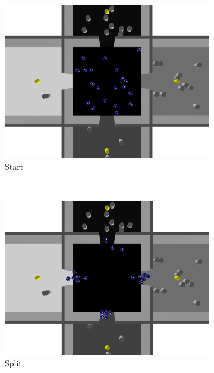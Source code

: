 \begin{figure}[h!]
        \centering
        \begin{subfigure}[b]{0.5\textwidth}
            \includegraphics[width=\textwidth]{images/1_start.png}
            \caption{Start}
        \end{subfigure}%
        ~
        \begin{subfigure}[b]{0.5\textwidth}
            \includegraphics[width=\textwidth]{images/2_split.png}
            \caption{Split}
        \end{subfigure}
        \hfill
        \begin{subfigure}[b]{0.5\textwidth}

\end{subfigure}
\end{figure}
